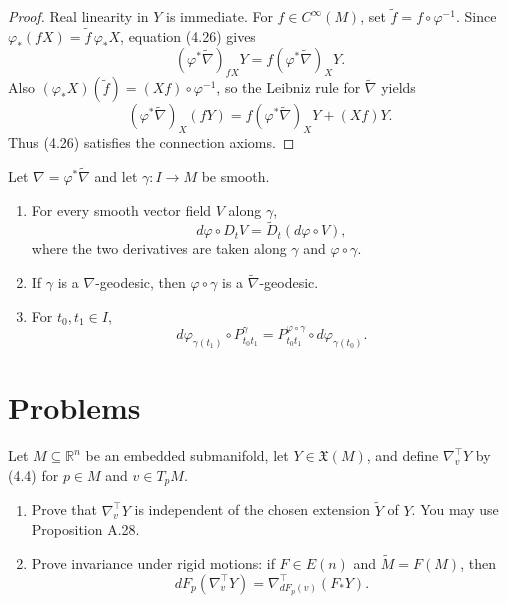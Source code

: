\begin{proof}
\sketch Real linearity in $Y$ is immediate. For $f\in C^\infty(M)$, set
$\widetilde f=f\circ\varphi^{-1}$. Since
$\varphi_*(fX)=\widetilde f\,\varphi_*X$, equation (4.26) gives
\[
(\varphi^*\widetilde\nabla)_{fX}Y
=f(\varphi^*\widetilde\nabla)_XY.
\]
Also $(\varphi_*X)(\widetilde f)=(Xf)\circ\varphi^{-1}$, so the Leibniz rule for
$\widetilde\nabla$ yields
\[
(\varphi^*\widetilde\nabla)_X(fY)
=f(\varphi^*\widetilde\nabla)_XY+(Xf)Y.
\]
Thus (4.26) satisfies the connection axioms.
\end{proof}

\begin{proposition}
\label{prop:pullback-connection-properties}
Let $\nabla=\varphi^*\widetilde\nabla$ and let $\gamma\colon I\to M$ be smooth.
\begin{enumerate}
\item[(a)] For every smooth vector field $V$ along $\gamma$,
\[
d\varphi\circ D_tV=\widetilde D_t(d\varphi\circ V),
\]
where the two derivatives are taken along $\gamma$ and $\varphi\circ\gamma$.
\item[(b)] If $\gamma$ is a $\nabla$-geodesic, then $\varphi\circ\gamma$ is a
$\widetilde\nabla$-geodesic.
\item[(c)] For $t_0,t_1\in I$,
\[
d\varphi_{\gamma(t_1)}\circ P_{t_0t_1}^\gamma
=P_{t_0t_1}^{\varphi\circ\gamma}\circ d\varphi_{\gamma(t_0)}.
\]
\end{enumerate}
\end{proposition}
\section{Problems}

\begin{exercise}
\label{prob:embedded-submanifold-covariant-derivative}
Let $M\subseteq\mathbb R^n$ be an embedded submanifold, let
$Y\in\mathfrak X(M)$, and define $\nabla_v^\top Y$ by (4.4) for
$p\in M$ and $v\in T_pM$.
\begin{enumerate}
\item[(a)] Prove that $\nabla_v^\top Y$ is independent of the chosen extension
$\widetilde Y$ of $Y$. You may use Proposition A.28.
\item[(b)] Prove invariance under rigid motions: if $F\in E(n)$ and
$\widetilde M=F(M)$, then
\[
dF_p(\nabla_v^\top Y)=\nabla_{dF_p(v)}^\top(F_*Y).
\]
\end{enumerate}
\end{exercise}

